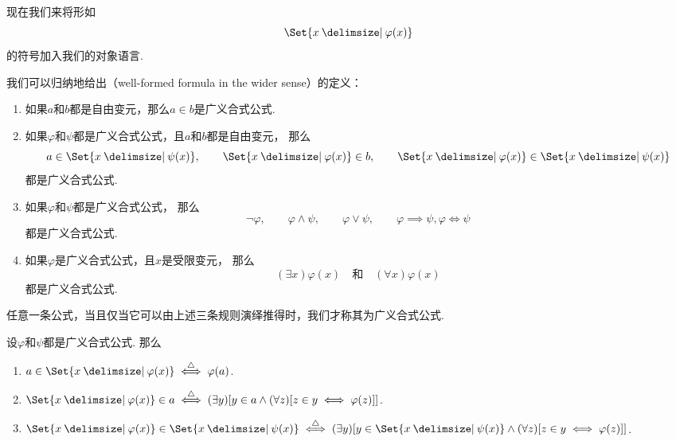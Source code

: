 现在我们来将形如\[
	\Set{ x \given \varphi(x) }
\]的符号加入我们的对象语言.
\begin{definition}
我们可以归纳地给出（well-formed formula in the wider sense）的定义：
\begin{enumerate}
	\item 如果\(a\)和\(b\)都是自由变元，那么\(a \in b\)是广义合式公式.
	\item 如果\(\varphi\)和\(\psi\)都是广义合式公式，且\(a\)和\(b\)都是自由变元，
	那么\[
		\def\A{\Set{ x \given \psi(x) }}
		\def\B{\Set{ x \given \varphi(x) }}
		a \in \A, \qquad
		\B \in b, \qquad
		\B \in \A
	\]都是广义合式公式.
	\item 如果\(\varphi\)和\(\psi\)都是广义合式公式，
	那么\[
		\neg\varphi, \qquad
		\varphi\land\psi, \qquad
		\varphi\lor\psi, \qquad
		\varphi\implies\psi,
		\varphi\iff\psi
	\]都是广义合式公式.
	\item 如果\(\varphi\)是广义合式公式，且\(x\)是受限变元，
	那么\[
		(\exists x)\varphi(x)
		\quad\text{和}\quad
		(\forall x)\varphi(x)
	\]都是广义合式公式.
\end{enumerate}
任意一条公式，当且仅当它可以由上述三条规则演绎推得时，我们才称其为广义合式公式.
\end{definition}

\begin{definition}
设\(\varphi\)和\(\psi\)都是广义合式公式.
\def\A{\Set{ x \given \varphi(x) }}
\def\B{\Set{ x \given \psi(x) }}
那么\begin{enumerate}
	\item \(a \in \A \defiff \varphi(a)\).
	\item \(\A \in a \defiff (\exists y)[y \in a \land (\forall z)[z \in y \iff \varphi(z)]]\).
	\item \(\A \in \B \defiff (\exists y)[y \in \B \land (\forall z)[z \in y \iff \varphi(z)]]\).
\end{enumerate}
\end{definition}

